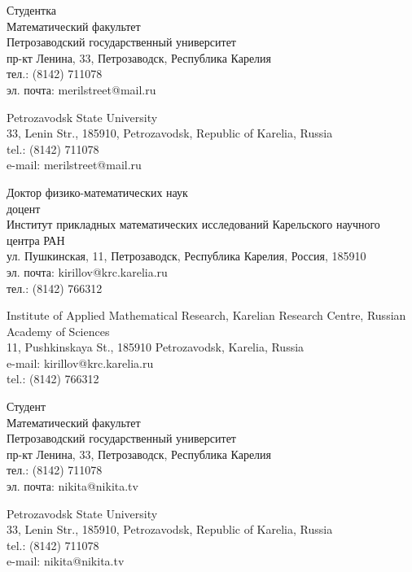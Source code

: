 \documentclass{article}
\begin{document}
\begin{aboutauthors}
Студентка\\
Математический факультет\\ 
Петрозаводский государственный университет\\
пр-кт Ленина, 33, Петрозаводск, Республика Карелия\\
тел.: (8142) 711078\\
эл. почта: merilstreet@mail.ru

\columnbreak

Petrozavodsk State University\\
33, Lenin Str., 185910, Petrozavodsk, Republic of Karelia, Russia\\
tel.: (8142) 711078\\
e-mail: merilstreet@mail.ru
\end{aboutauthors}

\begin{aboutauthors}
Доктор физико-математических наук\\ 
доцент\\
Институт прикладных математических исследований Карельского научного центра РАН\\ 
ул. Пушкинская, 11, Петрозаводск, Республика Карелия, Россия, 185910\\
эл. почта: kirillov@krc.karelia.ru\\
тел.: (8142) 766312

\columnbreak

Institute of Applied Mathematical Research, Karelian Research Centre, Russian Academy of Sciences\\
11, Pushkinskaya St., 185910 Petrozavodsk, Karelia, Russia\\
e-mail: kirillov@krc.karelia.ru\\
tel.: (8142) 766312
\end{aboutauthors}

\begin{aboutauthors}
Студент\\
Математический факультет\\ 
Петрозаводский государственный университет\\
пр-кт Ленина, 33, Петрозаводск, Республика Карелия\\
тел.: (8142) 711078\\
эл. почта: nikita@nikita.tv

\columnbreak

Petrozavodsk State University\\
33, Lenin Str., 185910, Petrozavodsk, Republic of Karelia, Russia\\
tel.: (8142) 711078\\
e-mail: nikita@nikita.tv 
\end{aboutauthors}
\end{document}
